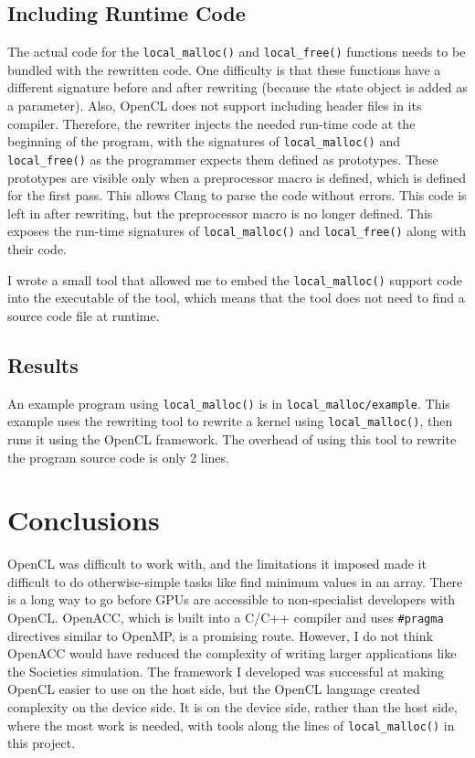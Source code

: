 \documentclass{article}
\begin{document}
\subsection{Including Runtime Code}
The actual code for the \texttt{local\_malloc()} and \texttt{local\_free()} functions needs to be bundled with the rewritten code. One difficulty is that these functions have a different signature before and after rewriting (because the state object is added as a parameter). Also, OpenCL does not support including header files in its compiler. Therefore, the rewriter injects the needed run-time code at the beginning of the program, with the signatures of \texttt{local\_malloc()} and \texttt{local\_free()} as the programmer expects them defined as prototypes. These prototypes are visible only when a preprocessor macro is defined, which is defined for the first pass. This allows Clang to parse the code without errors. This code is left in after rewriting, but the preprocessor macro is no longer defined. This exposes the run-time signatures of \texttt{local\_malloc()} and \texttt{local\_free()} along with their code.

I wrote a small tool that allowed me to embed the \texttt{local\_malloc()} support code into the executable of the tool, which means that the tool does not need to find a source code file at runtime.

\subsection{Results}
An example program using \texttt{local\_malloc()} is in \texttt{local\_malloc/example}. This example uses the rewriting tool to rewrite a kernel using \texttt{local\_malloc()}, then runs it using the OpenCL framework. The overhead of using this tool to rewrite the program source code is only 2 lines.

\section{Conclusions}
OpenCL was difficult to work with, and the limitations it imposed made it difficult to do otherwise-simple tasks like find minimum values in an array. There is a long way to go before GPUs are accessible to non-specialist developers with OpenCL. OpenACC, which is built into a C/C++ compiler and uses \texttt{\#pragma} directives similar to OpenMP, is a promising route. However, I do not think OpenACC would have reduced the complexity of writing larger applications like the Societies simulation. The framework I developed was successful at making OpenCL easier to use on the host side, but the OpenCL language created complexity on the device side. It is on the device side, rather than the host side, where the most work is needed, with tools along the lines of \texttt{local\_malloc()} in this project.
\end{document}
